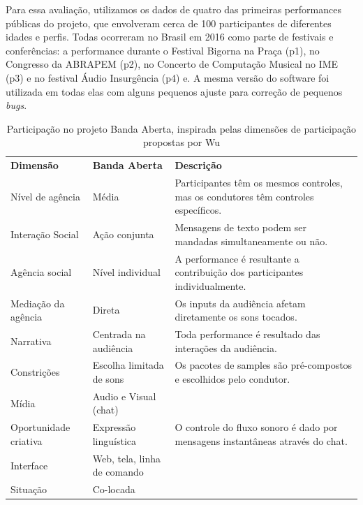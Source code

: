 
Para essa avaliação, utilizamos os dados de quatro das primeiras performances públicas do projeto, que envolveram cerca de 100 participantes de diferentes idades e perfis. Todas ocorreram no Brasil em 2016 como parte de festivais e conferências: a performance durante o Festival Bigorna na Praça (p1), no Congresso da ABRAPEM (p2), no Concerto de Computação Musical no IME (p3) e no festival Áudio Insurgência (p4) e. A mesma versão do software foi utilizada em todas elas com alguns pequenos ajuste para correção de pequenos \emph{bugs}.





\begin{table}
\ABNTEXfontereduzida
\caption{Participação no projeto Banda Aberta, inspirada pelas dimensões de participação propostas por Wu \cite{wu2017open}}{%
\begin{tabular}{p{3.5cm}p{3.5cm}p{6cm}}
\hline
\textbf{Dimensão } & \textbf{Banda Aberta} & \textbf{Descrição} \\
Nível de agência & Média & Participantes têm os mesmos controles, mas os condutores têm controles específicos.\\
Interação Social & Ação conjunta & Mensagens de texto podem ser mandadas simultaneamente ou não.\\
Agência social  & Nível individual & A performance é resultante a contribuição dos participantes individualmente.\\
Mediação da agência & Direta & Os inputs da audiência afetam diretamente os sons tocados. \\
Narrativa & Centrada na audiência & Toda performance é resultado das interações da audiência.\\
Constrições & Escolha limitada de sons & Os pacotes de samples são pré-compostos e escolhidos pelo condutor.\\
Mídia & Audio e Visual (chat) & \\
Oportunidade criativa & Expressão linguística & O controle do fluxo sonoro é dado por mensagens instantâneas através do chat.\\
Interface & Web, tela, linha de comando & \\
Situação & Co-locada & \\
\hline
\end{tabular}}
\label{tab:participation}
\end{table}

